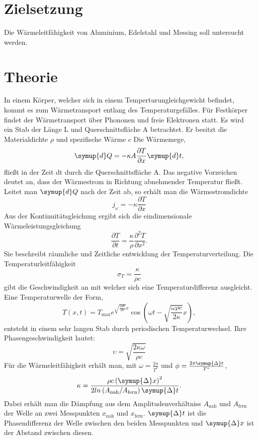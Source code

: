 \section{Zielsetzung}
Die Wärmeleitfähigkeit von Aluminium, Edelstahl und Messing soll untersucht werden.
\section{Theorie}
\label{sec:Theorie}
In einem Körper, welcher sich in einem Temperturungleichgewicht befindet, kommt es zum Wärmetransport entlang des Temperaturgefälles.
Für Festkörper findet der Wärmetransport über Phononen und freie Elektronen statt.
Es wird ein Stab der Länge L und Querschnittsfläche A betrachtet.
Er besitzt die Materialdichte $\rho$ und spezifische Wärme $c$
Die Wärmemege,
\begin{equation}
    \symup{d}Q =-  \kappa A \frac{\partial T}{\partial x} \symup{d}t ,
\end{equation}
fließt in der Zeit dt durch die Querschnittsfläche A.
Das negative Vorzeichen deutet an, dass der Wärmestrom in Richtung abnehmender Temperatur fließt.
Leitet man $\symup{d}Q$ nach der Zeit ab, so erhält man die Wärmestromdichte
\begin{equation}
    j_\omega =- \kappa \frac{\partial T}{\partial x}
\end{equation}
Aus der Kontinuitätsgleichung ergibt sich die eindimensionale Wärmeleistungsgleichung
\begin{equation}
    \frac{\partial T}{\partial t} = \frac {\kappa}{\rho} \frac{\partial^2  T}{\partial x^2} .
\end{equation}
Sie beschreibt räumliche und Zeitliche entwicklung der Temperaturverteilung.
Die Temperaturleitfähigkeit
\begin{equation}
    \sigma_T = \frac{\kappa}{\rho c}
\end{equation}
gibt die Geschwindigkeit an mit welcher sich eine Temperaturdifferenz ausgleicht.
%
Eine Temperaturwelle der Form,
\begin{equation}
    T\left(x,t\right) = T_\text{max}e^{\sqrt{\frac{\omega\rho c}{2 \kappa}}x} \cos\left(\omega t - \sqrt{\frac{\omega\rho c}{2 \kappa}}x\right) ,
\label{eqn:thermowelle}
\end{equation}
entsteht in einem sehr langen Stab durch periodischen Temperaturwechsel.
Ihre Phasengeschwindigkeit lautet:
\begin{equation}
    \upsilon = \sqrt{\frac{2\kappa\omega}{\rho c}}
\end{equation}
Für die Wärmeleitfähigkeit erhält man, mit  $\omega=\frac{2\pi}{T^*}$ und $\phi=\frac{2\pi\symup{\Delta}t}{T^*}$,
\begin{equation}
    \kappa = \frac{\rho c\left(\symup{\Delta}x\right)^2}{2 ln\left(A_\text{nah}/A_\text{fern}\right)\symup{\Delta}t}.
    \label{eqn:wleitfaehigkeit}
\end{equation}
Dabei erhält man die Dämpfung aus dem Amplitudenverhältniss $A_\text{nah}$ und $A_\text{fern}$ der Welle an zwei Messpunkten 
$x_\text{nah}$ und $x_\text{fern}$.
$\symup{\Delta}t$ ist die Phasendifferenz der Welle zwischen den beiden Messpunkten und $\symup{\Delta}x$ ist der Abstand zwischen 
diesen.
